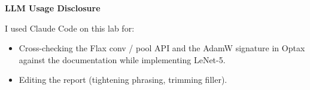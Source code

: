 \documentclass[11pt,a4paper]{article}
\begin{document}

\vspace{1em}

{\color{headingcolor}\sffamily\large\bfseries LLM Usage Disclosure}

\vspace{0.3em}

I used Claude Code on this lab for:
\begin{itemize}
    \item Cross-checking the Flax conv / pool API and the AdamW signature in Optax against the documentation while implementing LeNet-5.
    \item Editing the report (tightening phrasing, trimming filler).
\end{itemize}
\end{document}
